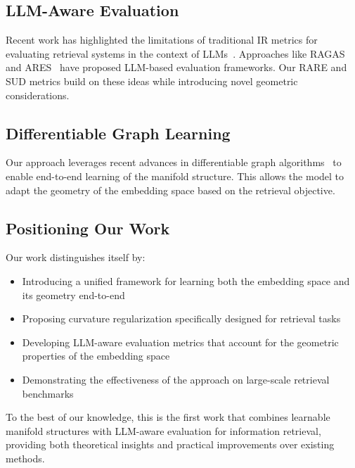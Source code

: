 \subsection{LLM-Aware Evaluation}
Recent work has highlighted the limitations of traditional IR metrics for evaluating retrieval systems in the context of LLMs~\cite{mao2023rethink}. Approaches like RAGAS~\cite{es2022ragas} and ARES~\cite{sai2023evaluating} have proposed LLM-based evaluation frameworks. Our RARE and SUD metrics build on these ideas while introducing novel geometric considerations.

\subsection{Differentiable Graph Learning}
Our approach leverages recent advances in differentiable graph algorithms~\cite{wang2019diffpool, vignac2022digress} to enable end-to-end learning of the manifold structure. This allows the model to adapt the geometry of the embedding space based on the retrieval objective.

\subsection{Positioning Our Work}
Our work distinguishes itself by:
\begin{itemize}
    \item Introducing a unified framework for learning both the embedding space and its geometry end-to-end
    \item Proposing curvature regularization specifically designed for retrieval tasks
    \item Developing LLM-aware evaluation metrics that account for the geometric properties of the embedding space
    \item Demonstrating the effectiveness of the approach on large-scale retrieval benchmarks
\end{itemize}

To the best of our knowledge, this is the first work that combines learnable manifold structures with LLM-aware evaluation for information retrieval, providing both theoretical insights and practical improvements over existing methods.
